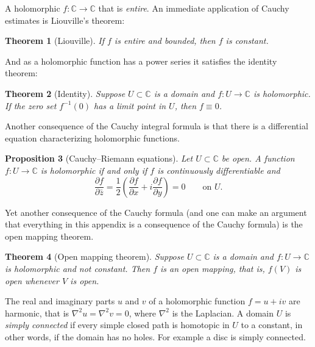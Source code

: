 \documentclass[12pt,openany]{book}
\newcommand{\C}{{\mathbb{C}}}
\newcommand{\myindex}[1]{#1\index{#1}}
\theoremstyle{plain}
\newtheorem{thm}{Theorem}[section]
\newtheorem{prop}[thm]{Proposition}
\theoremstyle{remark}
\theoremstyle{definition}
\theoremstyle{exercise}
\theoremstyle{example}
\begin{document}
A holomorphic $f \colon \C \to \C$ that is
\emph{\myindex{entire}}.  An immediate application of Cauchy estimates
is Liouville's theorem:

\begin{thm}[Liouville]
If $f$ is entire and bounded, then $f$ is constant.
\end{thm}

And as a holomorphic function has a power series it satisfies the
identity theorem:

\begin{thm}[Identity] \label{thm:onevaridentity}
Suppose $U \subset \C$ is a domain and $f \colon U \to \C$ is holomorphic.
If the zero set $f^{-1}(0)$ has a limit point in $U$, then
$f \equiv 0$.
\end{thm}

Another consequence  of the Cauchy integral formula is that there is
a differential equation characterizing holomorphic functions.

\begin{prop}[Cauchy--Riemann equations]
Let $U \subset \C$ be open.
A function $f \colon U \to \C$ is holomorphic if and only if
$f$ is continuously differentiable and
\begin{equation*}
\frac{\partial f}{\partial \bar{z}}
=
\frac{1}{2}
\left(
\frac{\partial f}{\partial x} + i
\frac{\partial f}{\partial y}
\right)
 = 0 \qquad \text{on $U$.}
\end{equation*}
\end{prop}

Yet another consequence of the Cauchy formula (and one can make an argument
that everything in this appendix is a consequence of the Cauchy formula)
is the open mapping theorem.

\begin{thm}[Open mapping theorem]
Suppose $U \subset \C$ is a domain and
$f \colon U \to \C$ is holomorphic and not constant.
Then $f$ is an open mapping, that is,
$f(V)$ is open whenever $V$ is open.
\end{thm}

The real and imaginary parts $u$ and $v$ of a holomorphic function $f =
u+iv$ are harmonic, that is
$\nabla^2 u = \nabla^2 v = 0$, where $\nabla^2$ is the
Laplacian.
A domain $U$ is \emph{\myindex{simply connected}} if every simple closed
path
is homotopic in $U$ to a constant, in other words, if the domain has no
holes.  For example a disc is simply connected.
\end{document}
